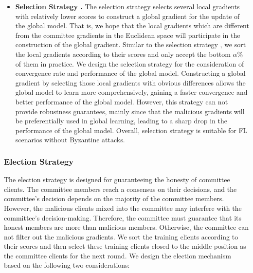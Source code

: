 \documentclass[10pt,journal,compsoc]{IEEEtran}
\begin{document}
\begin{itemize}
\item \textbf{Selection Strategy \uppercase\expandafter{}.} The selection strategy \uppercase\expandafter{} selects several local gradients with relatively lower scores to construct a global gradient for the update of the global model. That is, we hope that the local gradients which are different from the committee gradients in the Euclidean space will participate in the construction of the global gradient. Similar to the selection strategy \uppercase\expandafter{}, we sort the local gradients according to their scores and only accept the bottom $\alpha\%$ of them in practice. We design the selection strategy \uppercase\expandafter{} for the consideration of convergence rate and performance of the global model. Constructing a global gradient by selecting those local gradients with obvious differences allows the global model to learn more comprehensively, gaining a faster convergence and better performance of the global model. However, this strategy can not provide robustness guarantees, mainly since that the malicious gradients will be preferentially used in global learning, leading to a sharp drop in the performance of the global model. Overall, selection strategy \uppercase\expandafter{} is suitable for FL scenarios without Byzantine attacks. 
\end{itemize}

\subsubsection{Election Strategy}
\label{election}

The election strategy is designed for guaranteeing the honesty of committee clients. The committee members reach a consensus on their decisions, and the committee's decision depends on the majority of the committee members. However, the malicious clients mixed into the committee may interfere with the committee's decision-making. Therefore, the committee must guarantee that its honest members are more than malicious members. Otherwise, the committee can not filter out the malicious gradients. We sort the training clients according to their scores and then select these training clients closed to the middle position as the committee clients for the next round. We design the election mechanism based on the following two considerations:
\end{document}
